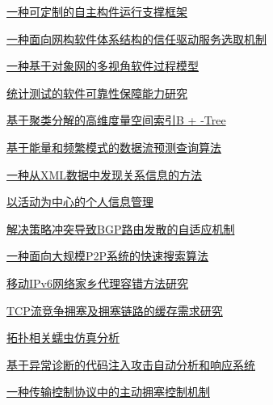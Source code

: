 \documentclass[a4paper]{article}
\begin{document}
\href{http://www.jos.org.cn/ch/reader/download_pdf.aspx?file_no=20080608&year_id=2008&quarter_id=6&falg=1}{一种可定制的自主构件运行支撑框架}

\href{http://www.jos.org.cn/ch/reader/download_pdf.aspx?file_no=20080609&year_id=2008&quarter_id=6&falg=1}{一种面向网构软件体系结构的信任驱动服务选取机制}

\href{http://www.jos.org.cn/ch/reader/download_pdf.aspx?file_no=20080610&year_id=2008&quarter_id=6&falg=1}{一种基于对象网的多视角软件过程模型}

\href{http://www.jos.org.cn/ch/reader/download_pdf.aspx?file_no=20080611&year_id=2008&quarter_id=6&falg=1}{统计测试的软件可靠性保障能力研究}

\href{http://www.jos.org.cn/ch/reader/download_pdf.aspx?file_no=20080613&year_id=2008&quarter_id=6&falg=1}{基于聚类分解的高维度量空间索引B + -Tree}

\href{http://www.jos.org.cn/ch/reader/download_pdf.aspx?file_no=20080614&year_id=2008&quarter_id=6&falg=1}{基于能量和频繁模式的数据流预测查询算法}

\href{http://www.jos.org.cn/ch/reader/download_pdf.aspx?file_no=20080615&year_id=2008&quarter_id=6&falg=1}{一种从XML数据中发现关系信息的方法}

\href{http://www.jos.org.cn/ch/reader/download_pdf.aspx?file_no=20080616&year_id=2008&quarter_id=6&falg=1}{以活动为中心的个人信息管理}

\href{http://www.jos.org.cn/ch/reader/download_pdf.aspx?file_no=20080619&year_id=2008&quarter_id=6&falg=1}{解决策略冲突导致BGP路由发散的自适应机制}

\href{http://www.jos.org.cn/ch/reader/download_pdf.aspx?file_no=20080620&year_id=2008&quarter_id=6&falg=1}{一种面向大规模P2P系统的快速搜索算法}

\href{http://www.jos.org.cn/ch/reader/download_pdf.aspx?file_no=20080622&year_id=2008&quarter_id=6&falg=1}{移动IPv6网络家乡代理容错方法研究}

\href{http://www.jos.org.cn/ch/reader/download_pdf.aspx?file_no=20080623&year_id=2008&quarter_id=6&falg=1}{TCP流竞争拥塞及拥塞链路的缓存需求研究}

\href{http://www.jos.org.cn/ch/reader/download_pdf.aspx?file_no=20080624&year_id=2008&quarter_id=6&falg=1}{拓扑相关蠕虫仿真分析}

\href{http://www.jos.org.cn/ch/reader/download_pdf.aspx?file_no=20080625&year_id=2008&quarter_id=6&falg=1}{基于异常诊断的代码注入攻击自动分析和响应系统}

\href{http://www.jos.org.cn/ch/reader/download_pdf.aspx?file_no=20080626&year_id=2008&quarter_id=6&falg=1}{一种传输控制协议中的主动拥塞控制机制}
\end{document}
